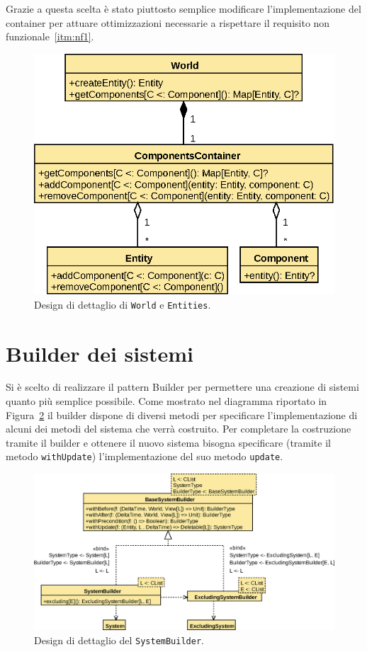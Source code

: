 Grazie a questa scelta è stato piuttosto semplice modificare l'implementazione del container per attuare ottimizzazioni
necessarie a rispettare il requisito non funzionale~\ref{itm:nf1}.
\begin{figure}[H]
    \centering
    \includegraphics[width=\textwidth]{./img/WorldDetail}
    \caption{Design di dettaglio di \texttt{World} e \texttt{Entities}.}
    \label{fig:world-detail}
\end{figure}

\section{Builder dei sistemi}\label{sec:builder-dei-sistemi}
Si è scelto di realizzare il pattern Builder per permettere una creazione di sistemi quanto più semplice possibile.
Come mostrato nel diagramma riportato in Figura~\ref{fig:system-builder} il builder dispone di diversi
metodi per specificare l'implementazione di alcuni dei metodi del sistema che verrà costruito.
Per completare la costruzione tramite il builder e ottenere il nuovo sistema bisogna specificare
(tramite il metodo \texttt{withUpdate}) l'implementazione del suo metodo \texttt{update}.

\begin{figure}[H]
    \centering
    \includegraphics[width=\textwidth]{./img/SystemBuilder}
    \caption{Design di dettaglio del \texttt{SystemBuilder}.}
    \label{fig:system-builder}
\end{figure}
